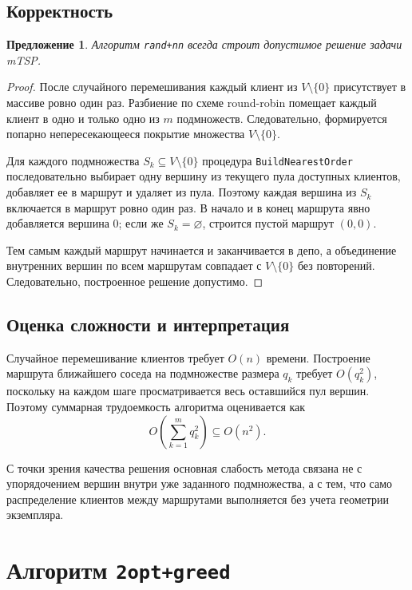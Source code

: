 \documentclass[a4paper,12pt]{article}
\newtheorem{proposition}{Предложение}[section]
\newcommand{\clients}{V \setminus \{0\}}
\begin{document}
\subsection{Корректность}

\begin{proposition}
Алгоритм \texttt{rand+nn} всегда строит допустимое решение задачи mTSP.
\end{proposition}

\begin{proof}
После случайного перемешивания каждый клиент из \(\clients\) присутствует в массиве ровно
один раз. Разбиение по схеме round-robin помещает каждый клиент в одно и только одно из
\(m\) подмножеств. Следовательно, формируется попарно непересекающееся покрытие множества
\(\clients\).

Для каждого подмножества \(S_k \subseteq \clients\) процедура \texttt{BuildNearestOrder}
последовательно выбирает одну вершину из текущего пула доступных клиентов, добавляет ее в
маршрут и удаляет из пула. Поэтому каждая вершина из \(S_k\) включается в маршрут ровно
один раз. В начало и в конец маршрута явно добавляется вершина \(0\); если же
\(S_k = \varnothing\), строится пустой маршрут \((0,0)\).

Тем самым каждый маршрут начинается и заканчивается в депо, а объединение внутренних вершин
по всем маршрутам совпадает с \(\clients\) без повторений. Следовательно, построенное
решение допустимо.
\end{proof}

\subsection{Оценка сложности и интерпретация}

Случайное перемешивание клиентов требует \(O(n)\) времени. Построение маршрута ближайшего
соседа на подмножестве размера \(q_k\) требует \(O(q_k^2)\), поскольку на каждом шаге
просматривается весь оставшийся пул вершин. Поэтому суммарная трудоемкость алгоритма
оценивается как
\[
O\!\left(\sum_{k=1}^{m} q_k^2 \right) \subseteq O(n^2).
\]

С точки зрения качества решения основная слабость метода связана не с упорядочением вершин
внутри уже заданного подмножества, а с тем, что само распределение клиентов между
маршрутами выполняется без учета геометрии экземпляра.

\section{Алгоритм \texttt{2opt+greed}}
\end{document}
